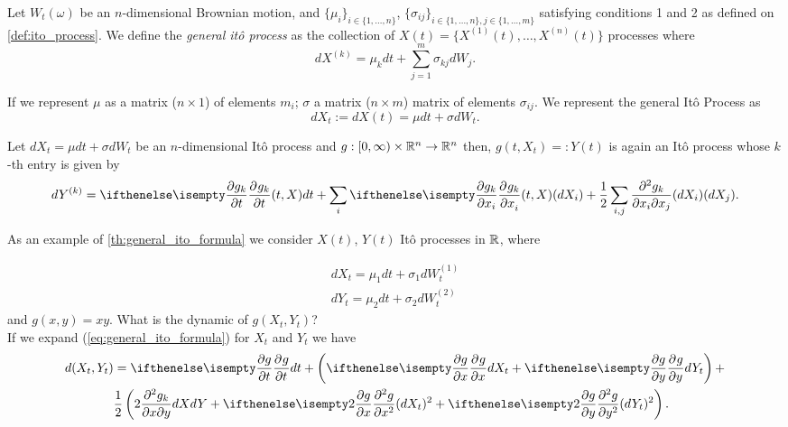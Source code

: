 \documentclass[../TGMAFFIRO.tex]{subfiles}
\begin{document}
\begin{definition}
	Let $W_t(\omega)$ be an $n$-dimensional Brownian motion, and $\{\mu_i\}_{i\in\{1,\ldots,n\}}$, $\{\sigma_{ij}\}_{i\in\{1,\ldots,n\}, j\in\{1,\ldots,m\}}$ satisfying conditions 1 and 2 as defined on \ref{def:ito_process}. We define the \textit{general it\^o process} as the collection of $X(t) = \{X^{(1)}(t), \ldots, X^{(n)}(t)\}$ processes where
	\begin{equation}
		dX^{(k)} = \mu_k dt + \sum_{j=1}^{m}\sigma_{kj} dW_j.
	\end{equation}

If we represent $\mu$ as a matrix ($n\times 1$) of elements $m_i$; $\sigma$ a matrix ($n\times m$) matrix of elements $\sigma_{ij}$. We represent the general It\^o Process as
\begin{equation}
  dX_t := dX(t) = \mu dt + \sigma dW_t.
\end{equation}
\end{definition}
	
\begin{theorem}\label{th:general_ito_formula}
	Let $dX_t = \mu dt + \sigma dW_t $ be an $n$-dimensional It\^o process and $g:[0,\infty)\times\mathbb{R}^n\to\mathbb{R}^n$ then, $g(t, X_t) =: Y(t)$ is again an It\^o process whose $k$-th entry is given by
	\begin{equation}
		dY^{(k)} = \partialwrt{g_k}{t}{(t, X)} dt + \sum_i \partialwrt{g_k}{x_i}{(t, X)}(dX_i) + \frac{1}{2}\sum_{i,j}\frac{\partial^2g_k}{\partial x_i\partial x_j} (dX_i)(dX_j).\label{eq:general_ito_formula}
	\end{equation}
\end{theorem}

As an example of \ref{th:general_ito_formula} we consider $X(t)$, $Y(t)$ It\^o processes in $\mathbb{R}$, where

\begin{align}
	dX_t = \mu_1 dt + \sigma_1 dW^{(1)}_t\nonumber\\
	dY_t = \mu_2 dt + \sigma_2 dW^{(2)}_t\nonumber
\end{align}
 and $g(x,y) = xy$. What is the dynamic of $g(X_t, Y_t)$?\\

If we expand (\ref{eq:general_ito_formula}) for $X_t$ and $Y_t$ we have
\begin{align}
  d(X_t, Y_t) &= \partialwrt{g}{t}{} dt + \left(\partialwrt{g}{x} dX_t + \partialwrt{g}{y} dY_t \right) + \nonumber \\
  & \frac{1}{2}\left(2\frac{\partial^2g_k}{\partial x\partial y} dX dY + \partialwrt[2]{g}{x} (dX_t)^2 + \partialwrt[2]{g}{y} (dY_t)^2 \right). \label{eqproof:ito_prod_formula}
\end{align}
\end{document}
